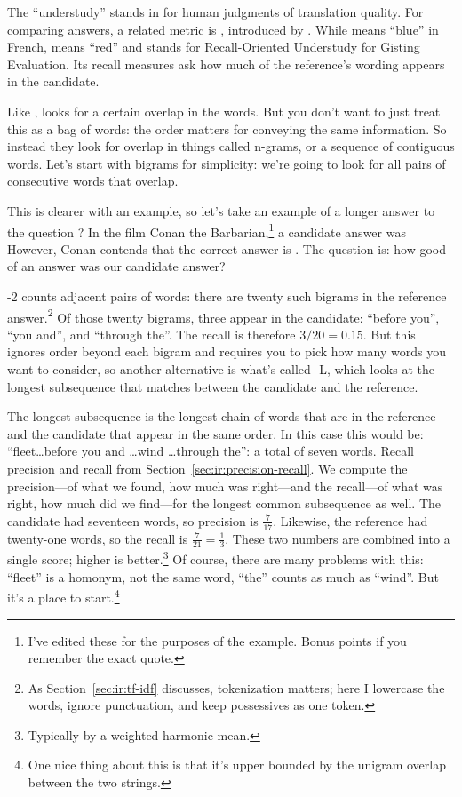 The ``understudy'' stands in for human judgments of translation quality.  For comparing answers, a related metric is , introduced by \citet{lin-04}.  While  means ``blue'' in French,  means ``red'' and stands for Recall-Oriented Understudy for Gisting Evaluation.  Its recall measures ask how much of the reference's wording appears in the candidate.

Like ,  looks for a certain overlap in the words.  But you don't want to just treat this as a bag of words: the order matters for conveying the same information.  So instead they look for overlap in things called n-grams, or a sequence of contiguous words.  Let's start with bigrams for simplicity: we're going to look for all pairs of consecutive words that overlap.

This is clearer with an example, so let's take an example of a longer answer to the question ?  In the film Conan the Barbarian,\footnote{I've edited these for the purposes of the example.  Bonus points if you remember the exact quote.} a candidate answer was   However, Conan contends that the correct answer is .  The question is: how good of an answer was our candidate answer?

-2 counts adjacent pairs of words: there are twenty such bigrams in the reference answer.\footnote{As Section~\ref{sec:ir:tf-idf} discusses, tokenization matters; here I lowercase the words, ignore punctuation, and keep possessives as one token.}  Of those twenty bigrams, three appear in the candidate: ``before you'', ``you and'', and ``through the''.  The recall is therefore $3/20=0.15$.  But this ignores order beyond each bigram and requires you to pick how many words you want to consider, so another alternative is what's called -L, which looks at the longest subsequence that matches between the candidate and the reference.

The longest subsequence is the longest chain of words that are in the reference and the candidate that appear in the same order.  In this case this would be: ``fleet\dots before you and \dots wind \dots through the'': a total of seven words.  Recall precision and recall from Section~\ref{sec:ir:precision-recall}.  We compute the precision---of what we found, how much was right---and the recall---of what was right, how much did we find---for the longest common subsequence as well.  The candidate had seventeen words, so precision is $\frac{7}{17}$.  Likewise, the reference had twenty-one words, so the recall is $\frac{7}{21}=\frac{1}{3}$.  These two numbers are combined into a single score; higher is better.\footnote{Typically by a weighted harmonic mean.}  Of course, there are many problems with this: ``fleet'' is a homonym, not the same word, ``the'' counts as much as ``wind''.  But it's a place to start.\footnote{One nice thing about this is that it's upper bounded by the unigram overlap between the two strings.}


